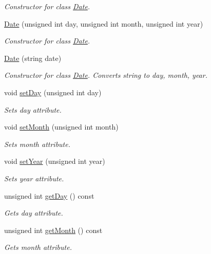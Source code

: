 \begin{DoxyCompactItemize}
\begin{DoxyCompactList}\small\item\em Constructor for class \hyperlink{class_date}{Date}. \end{DoxyCompactList}\item 
\hyperlink{class_date_a28c6604a0f8ed8216becf24abc20cf5b}{Date} (unsigned int day, unsigned int month, unsigned int year)
\begin{DoxyCompactList}\small\item\em Constructor for class \hyperlink{class_date}{Date}. \end{DoxyCompactList}\item 
\hyperlink{class_date_a5532efafed41fd5f8e013a61313200dc}{Date} (string date)
\begin{DoxyCompactList}\small\item\em Constructor for class \hyperlink{class_date}{Date}. Converts string to day, month, year. \end{DoxyCompactList}\item 
void \hyperlink{class_date_a18dc2bd52ab8adcca331f66c27ed6623}{set\+Day} (unsigned int day)
\begin{DoxyCompactList}\small\item\em Sets day attribute. \end{DoxyCompactList}\item 
void \hyperlink{class_date_aa83b79359070012ab58ff99abeb34340}{set\+Month} (unsigned int month)
\begin{DoxyCompactList}\small\item\em Sets month attribute. \end{DoxyCompactList}\item 
void \hyperlink{class_date_a1299c7e1f0080304f082a9225a743957}{set\+Year} (unsigned int year)
\begin{DoxyCompactList}\small\item\em Sets year attribute. \end{DoxyCompactList}\item 
unsigned int \hyperlink{class_date_a254204c492d3ebc26a2c62d532e34844}{get\+Day} () const 
\begin{DoxyCompactList}\small\item\em Gets day attribute. \end{DoxyCompactList}\item 
unsigned int \hyperlink{class_date_ac471b901531b7a1e73809918bac8c1ec}{get\+Month} () const 
\begin{DoxyCompactList}\small\item\em Gets month attribute. \end{DoxyCompactList}\item 

\end{DoxyCompactItemize}
